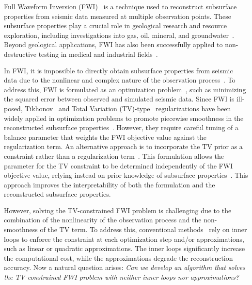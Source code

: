 Full Waveform Inversion (FWI)~\cite{FWI0,FWI1} is a technique used to reconstruct subsurface properties from seismic data measured at multiple observation points.
These subsurface properties play a crucial role in geological research and resource exploration, including investigations into gas, oil, mineral, and groundwater~\cite{FWI1,FWIApplicationGroundwater0,FWIApplicationGroundwater1}.
Beyond geological applications, FWI has also been successfully applied to non-destructive testing in medical and industrial fields~\cite{FWIApplicationNonDestructiveTesting0,FWIApplicationNonDestructiveTesting1}.

In FWI, it is impossible to directly obtain subsurface properties from seismic data due to the nonlinear and complex nature of the observation process~\cite{FWI1}.
To address this, FWI is formulated as an optimization problem~\cite{FWI0,CustomFWI0,CustomFWI1,CustomFWI2,CustomFWI3,CustomFWI4,CustomFWI5}, such as minimizing the squared error between observed and simulated seismic data.
Since FWI is ill-posed, Tikhonov~\cite{tikhonov} and Total Variation (TV)-type~\cite{TV,TGV} regularizations have been widely applied in optimization problems to promote piecewise smoothness in the reconstructed subsurface properties~\cite{FWI-with-tikhonov-regularization,FWI-with-TV-regularization,FWI-with-directional-TV-regularization,FWI-with-high-order-TV-regularization,FWI-with-TGV-regularization}.
However, they require careful tuning of a balance parameter that weights the FWI objective value against the regularization term.
An alternative approach is to incorporate the TV prior as a constraint rather than a regularization term~\cite{FWI-with-TV-constraint,FWI-with-TV-constraint2,FWI-with-TV-constraint3,FWI-with-TV-constraint4}.
This formulation allows the parameter for the TV constraint to be determined independently of the FWI objective value, relying instead on prior knowledge of subsurface properties~\mbox{\cite{constraint0,constraint1,constraint2,constraint3,constraint4,constraints-vs-penalties-in-FWI}}.
This approach improves the interpretability of both the formulation and the reconstructed subsurface properties.

However, solving the TV-constrained FWI problem is challenging due to the combination of the nonlinearity of the observation process and the non-smoothness of the TV term.
To address this, conventional methods~\cite{FWI-with-TV-constraint,FWI-with-TV-constraint2,FWI-with-TV-constraint3,FWI-with-TV-constraint4} rely on inner loops to enforce the constraint at each optimization step and/or approximations, such as linear or quadratic approximations.
The inner loops significantly increase the computational cost, while the approximations degrade the reconstruction accuracy.
Now a natural question arises: \textit{Can we develop an algorithm that solves the TV-constrained FWI problem with neither inner loops nor approximations?}

